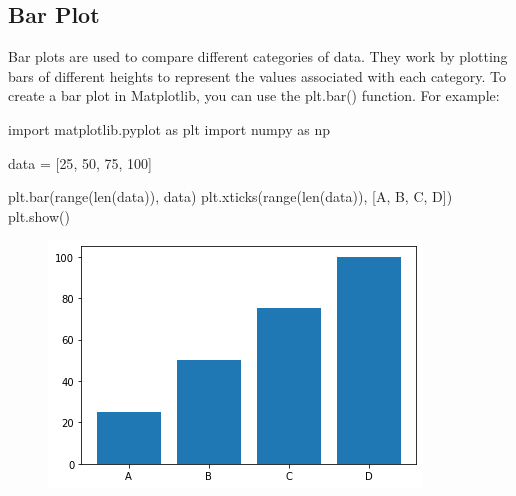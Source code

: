 \documentclass[11pt]{article}
\newenvironment{Shaded}{}{}
\newcommand{\DecValTok}[1]{\textcolor[rgb]{0.25,0.63,0.44}{{#1}}}
\newcommand{\StringTok}[1]{\textcolor[rgb]{0.25,0.44,0.63}{{#1}}}
\newcommand{\NormalTok}[1]{{#1}}
\newcommand{\ImportTok}[1]{{#1}}
\newcommand{\OperatorTok}[1]{\textcolor[rgb]{0.40,0.40,0.40}{{#1}}}
\newcommand{\BuiltInTok}[1]{{#1}}
\begin{document}
\hypertarget{BarPlot}{%
\subsection{Bar Plot}\label{BarPlot}}

Bar plots are used to compare
different categories of data. They work by plotting bars of different
heights to represent the values associated with each category. To create
a bar plot in Matplotlib, you can use the plt.bar() function. For
example:

\begin{Shaded}
\begin{Highlighting}[]
\ImportTok{import}\NormalTok{ matplotlib.pyplot }\ImportTok{as}\NormalTok{ plt}
\ImportTok{import}\NormalTok{ numpy }\ImportTok{as}\NormalTok{ np}

\NormalTok{data }\OperatorTok{=}\NormalTok{ [}\DecValTok{25}\NormalTok{, }\DecValTok{50}\NormalTok{, }\DecValTok{75}\NormalTok{, }\DecValTok{100}\NormalTok{]}

\NormalTok{plt.bar(}\BuiltInTok{range}\NormalTok{(}\BuiltInTok{len}\NormalTok{(data)), data)}
\NormalTok{plt.xticks(}\BuiltInTok{range}\NormalTok{(}\BuiltInTok{len}\NormalTok{(data)), [}\StringTok{\textquotesingle{}A\textquotesingle{}}\NormalTok{, }\StringTok{\textquotesingle{}B\textquotesingle{}}\NormalTok{, }\StringTok{\textquotesingle{}C\textquotesingle{}}\NormalTok{, }\StringTok{\textquotesingle{}D\textquotesingle{}}\NormalTok{])}
\NormalTok{plt.show()}
\end{Highlighting}
\end{Shaded}

\begin{figure}
\centering
\includegraphics[scale=0.6]{bar.png}
\end{figure}
\end{document}
